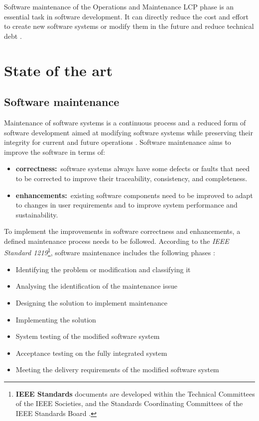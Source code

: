 Software maintenance of the Operations and Maintenance LCP phase is an essential task in software development. It can directly reduce the cost and effort to create new software systems or modify them in the future and reduce technical debt \cite{Thamburaj2017, DeLeon-Sigg2020}.

\clearpage

\section{State of the art}

\subsection{Software maintenance}\label{sec:ch1_softwareMaintenanceIntro}{}
Maintenance of software systems is a continuous process and a reduced form of software development aimed at modifying software systems while preserving their integrity for current and future operations \cite{Sneed2004, Ackermann2009, Port2017}. Software maintenance aims to improve the software in terms of:

\begin{itemize}
	\item \textbf{correctness:}~software systems always have some defects or faults that need to be corrected to improve their traceability, consistency, and completeness.
	\item \textbf{enhancements:}\RaggedRight~existing software components need to be improved to adapt to changes in user requirements and to improve system performance and sustainability.
\end{itemize}

To implement the improvements in software correctness and enhancements, a defined maintenance process needs to be followed. According to the \textit{IEEE Standard 1219}\footnote{\textbf{IEEE Standards} documents are developed within the Technical Committees of the IEEE Societies, and the Standards Coordinating Committees of the IEEE Standards Board \cite{Mamone1994}.}, software maintenance includes the following phases \cite{Mamone1994, Hasan2012, Stojanov2017}:

\begin{itemize}
	\item Identifying the problem or modification and classifying it
	\item Analysing the identification of the maintenance issue
	\item Designing the solution to implement maintenance
	\item Implementing the solution
	\item System testing of the modified software system
	\item Acceptance testing on the fully integrated system
	\item Meeting the delivery requirements of the modified software system
\end{itemize}

